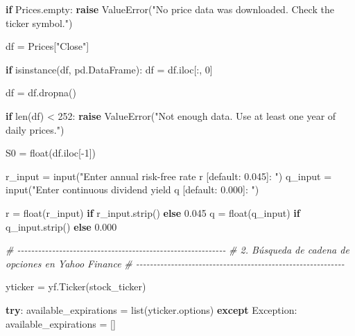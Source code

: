 \documentclass[
  11pt,
]{article}
\newenvironment{Shaded}{}{}
\newcommand{\BuiltInTok}[1]{\textcolor[rgb]{0.00,0.50,0.00}{#1}}
\newcommand{\CommentTok}[1]{\textcolor[rgb]{0.38,0.63,0.69}{\textit{#1}}}
\newcommand{\ControlFlowTok}[1]{\textcolor[rgb]{0.00,0.44,0.13}{\textbf{#1}}}
\newcommand{\DecValTok}[1]{\textcolor[rgb]{0.25,0.63,0.44}{#1}}
\newcommand{\FloatTok}[1]{\textcolor[rgb]{0.25,0.63,0.44}{#1}}
\newcommand{\NormalTok}[1]{#1}
\newcommand{\OperatorTok}[1]{\textcolor[rgb]{0.40,0.40,0.40}{#1}}
\newcommand{\PreprocessorTok}[1]{\textcolor[rgb]{0.74,0.48,0.00}{#1}}
\newcommand{\StringTok}[1]{\textcolor[rgb]{0.25,0.44,0.63}{#1}}
\begin{document}
\begin{Shaded}
\begin{Highlighting}[]
\ControlFlowTok{if}\NormalTok{ Prices.empty:}
    \ControlFlowTok{raise} \PreprocessorTok{ValueError}\NormalTok{(}\StringTok{"No price data was downloaded. Check the ticker symbol."}\NormalTok{)}

\NormalTok{df }\OperatorTok{=}\NormalTok{ Prices[}\StringTok{"Close"}\NormalTok{]}

\ControlFlowTok{if} \BuiltInTok{isinstance}\NormalTok{(df, pd.DataFrame):}
\NormalTok{    df }\OperatorTok{=}\NormalTok{ df.iloc[:, }\DecValTok{0}\NormalTok{]}

\NormalTok{df }\OperatorTok{=}\NormalTok{ df.dropna()}

\ControlFlowTok{if} \BuiltInTok{len}\NormalTok{(df) }\OperatorTok{\textless{}} \DecValTok{252}\NormalTok{:}
    \ControlFlowTok{raise} \PreprocessorTok{ValueError}\NormalTok{(}\StringTok{"Not enough data. Use at least one year of daily prices."}\NormalTok{)}

\NormalTok{S0 }\OperatorTok{=} \BuiltInTok{float}\NormalTok{(df.iloc[}\OperatorTok{{-}}\DecValTok{1}\NormalTok{])}

\NormalTok{r\_input }\OperatorTok{=} \BuiltInTok{input}\NormalTok{(}\StringTok{"Enter annual risk{-}free rate r [default: 0.045]: "}\NormalTok{)}
\NormalTok{q\_input }\OperatorTok{=} \BuiltInTok{input}\NormalTok{(}\StringTok{"Enter continuous dividend yield q [default: 0.000]: "}\NormalTok{)}

\NormalTok{r }\OperatorTok{=} \BuiltInTok{float}\NormalTok{(r\_input) }\ControlFlowTok{if}\NormalTok{ r\_input.strip() }\ControlFlowTok{else} \FloatTok{0.045}
\NormalTok{q }\OperatorTok{=} \BuiltInTok{float}\NormalTok{(q\_input) }\ControlFlowTok{if}\NormalTok{ q\_input.strip() }\ControlFlowTok{else} \FloatTok{0.000}


\CommentTok{\# {-}{-}{-}{-}{-}{-}{-}{-}{-}{-}{-}{-}{-}{-}{-}{-}{-}{-}{-}{-}{-}{-}{-}{-}{-}{-}{-}{-}{-}{-}{-}{-}{-}{-}{-}{-}{-}{-}{-}{-}{-}{-}{-}{-}{-}{-}{-}{-}{-}{-}{-}{-}{-}{-}{-}{-}{-}{-}{-}{-}}
\CommentTok{\# 2. Búsqueda de cadena de opciones en Yahoo Finance}
\CommentTok{\# {-}{-}{-}{-}{-}{-}{-}{-}{-}{-}{-}{-}{-}{-}{-}{-}{-}{-}{-}{-}{-}{-}{-}{-}{-}{-}{-}{-}{-}{-}{-}{-}{-}{-}{-}{-}{-}{-}{-}{-}{-}{-}{-}{-}{-}{-}{-}{-}{-}{-}{-}{-}{-}{-}{-}{-}{-}{-}{-}{-}}

\NormalTok{yticker }\OperatorTok{=}\NormalTok{ yf.Ticker(stock\_ticker)}

\ControlFlowTok{try}\NormalTok{:}
\NormalTok{    available\_expirations }\OperatorTok{=} \BuiltInTok{list}\NormalTok{(yticker.options)}
\ControlFlowTok{except} \PreprocessorTok{Exception}\NormalTok{:}
\NormalTok{    available\_expirations }\OperatorTok{=}\NormalTok{ []}


\end{Highlighting}
\end{Shaded}
\end{document}

